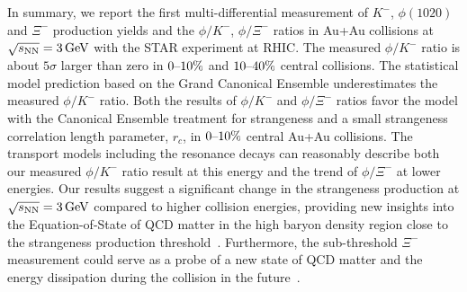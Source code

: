 \documentclass[%
 reprint,	
showpacs,
 amsmath,amssymb,
 aps,
 superscriptaddress,
]{revtex4-1}
\begin{document}
In summary, we report the first multi-differential measurement of $K^-$, $\phi(1020)$ and $\Xi^{-}$ production yields  and the $\phi/K^-$, $\phi/\Xi^-$ ratios in Au+Au collisions at ${\sqrt{s_{\rm NN}} = \rm{3\,GeV}}$ with the STAR experiment at RHIC. The measured $\phi/K^-$ ratio is about $5\sigma$ larger than zero in $\textup{0--10\%}$ and $\textup{10--40\%}$ central collisions. The statistical model prediction based on the Grand Canonical Ensemble underestimates the measured $\phi/K^-$ ratio. Both the results of $\phi/K^-$ and $\phi/\Xi^-$ ratios favor the model with the Canonical Ensemble treatment for strangeness and a small strangeness correlation length parameter, $r_c$, in $\textup{0--10\%}$ central Au+Au collisions. The transport models including the resonance decays can reasonably describe both our measured $\phi/K^-$ ratio result at this energy and the trend of $\phi/\Xi^-$ at lower energies. Our results suggest a significant change in the strangeness production at ${\sqrt{s_{\rm NN}} = \rm{3\,GeV}}$ compared to higher collision energies, providing new insights into the Equation-of-State of QCD matter in the high baryon density region close to the strangeness production threshold~\cite{KO_sQM17}. Furthermore, the sub-threshold $\Xi^-$ measurement could serve as a probe of a new state of QCD matter and the energy dissipation during the collision in the future~\cite{yong2021double,Ks0_Lambda_HADES}. 



\end{document}
